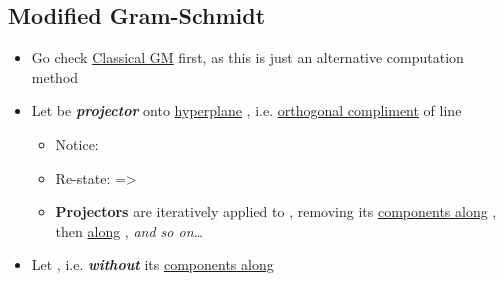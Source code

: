 \subsection*{Modified Gram-Schmidt}

\begin{itemize}

      \item
            Go check \underline{Classical GM} first, as this is just an alternative computation method
      \item
            Let
            be \textbf{\emph{projector}} onto \underline{hyperplane} ,
            i.e. \underline{orthogonal compliment} of line 

            \begin{itemize}

                  \item
                        Notice:
                  \item
                        Re-state:
                        =>
                  \item
                        \textbf{Projectors} 
                        are iteratively applied to , removing its \underline{components along} ,
                        then \underline{along} , \emph{and so on\ldots{}}
            \end{itemize}
      \item
            Let ,
            i.e.  \textbf{\emph{without}} its \underline{components along} 


\end{itemize}
